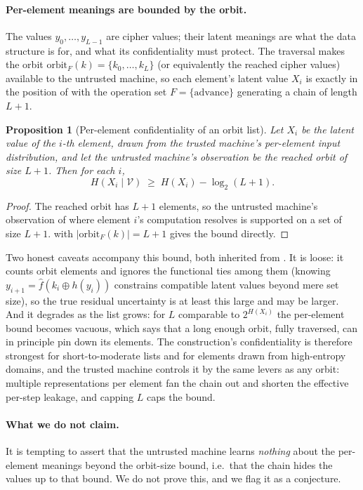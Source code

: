 \documentclass[11pt]{article}
\theoremstyle{definition}
\theoremstyle{plain}
\newtheorem{proposition}[theorem]{Proposition}
\theoremstyle{definition}
\theoremstyle{remark}
\newcommand{\fhat}{\hat{f}}
\newcommand{\orbitF}{\mathrm{orbit}_F}
\begin{document}
\paragraph{Per-element meanings are bounded by the orbit.} The values
$y_0, \ldots, y_{L-1}$ are cipher values; their latent meanings are
what the data structure is for, and what its confidentiality must
protect. The traversal makes the orbit $\orbitF(k) = \{k_0, \ldots,
k_{L}\}$ (or equivalently the reached cipher values) available to the
untrusted machine, so each element's latent value $X_i$ is exactly in
the position of  with the operation set $F =
\{\text{advance}\}$ generating a chain of length $L+1$.

\begin{proposition}[Per-element confidentiality of an orbit list]
\label{prop:per-element}
Let $X_i$ be the latent value of the $i$-th element, drawn from the
trusted machine's per-element input distribution, and let the
untrusted machine's observation be the reached orbit of size $L+1$.
Then for each $i$,
\[
H(X_i \mid \mathcal{V}) \;\geq\; H(X_i) - \log_2 (L+1).
\]
\end{proposition}

\begin{proof}
The reached orbit has $L+1$ elements, so the untrusted machine's
observation of where element $i$'s computation resolves is supported on
a set of size $L+1$.  with $|\orbitF(k)| = L+1$
gives the bound directly.
\end{proof}

Two honest caveats accompany this bound, both inherited from
. It is loose: it counts orbit elements and
ignores the functional ties among them (knowing $y_{i+1} =
\fhat(k_i \oplus h(y_i))$ constrains compatible latent values beyond
mere set size), so the true residual uncertainty is at least this
large and may be larger. And it degrades as the list grows: for $L$
comparable to $2^{H(X_i)}$ the per-element bound becomes vacuous, which
says that a long enough orbit, fully traversed, can in principle pin
down its elements. The construction's confidentiality is therefore
strongest for short-to-moderate lists and for elements drawn from
high-entropy domains, and the trusted machine controls it by the same
levers as any orbit: multiple representations per element fan the chain
out and shorten the effective per-step leakage, and capping $L$ caps
the bound.

\paragraph{What we do not claim.} It is tempting to assert that the
untrusted machine learns \emph{nothing} about the per-element meanings
beyond the orbit-size bound, i.e.\ that the chain hides the values up
to that bound. We do not prove this, and we flag it as a conjecture.
\end{document}
